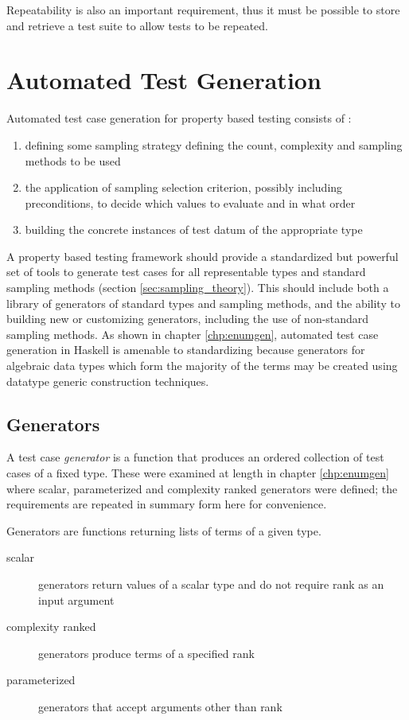 Repeatability is also an important requirement, thus
it must be possible to store and retrieve a test suite to allow tests to be repeated.


\section{Automated Test Generation} \label{reqtestgen}

Automated test case generation for property based testing consists of :

\begin{enumerate}
    \item defining some sampling strategy defining the count, complexity and sampling methods to be used
    \item the application of sampling selection criterion, possibly including preconditions, to decide which values to evaluate and in what order
    \item building the concrete instances of test datum of the appropriate type
\end{enumerate}

A property based testing framework should provide a
standardized but powerful set of tools to generate test cases
for all representable types and standard sampling methods (section \ref{sec:sampling_theory}).
This should include both a library of generators of standard types and sampling methods,
and the ability to building new or customizing generators,
including the use of non-standard sampling methods.
As shown in chapter \ref{chp:enumgen}, 
automated test case generation in Haskell is amenable to standardizing
because generators for algebraic data types which form the majority of the terms
may be created using datatype generic construction techniques.

\subsection{Generators}

A test case \emph{generator} is a function that produces an ordered collection of test cases of a fixed type.
These were examined at length in chapter \ref{chp:enumgen}
where scalar, parameterized and complexity ranked generators were defined;
the requirements are repeated in summary form here for convenience.

Generators are functions returning lists of terms of a given type.
\begin{description}
    \item[scalar] generators return values of a scalar type and do not require rank as an input argument
    \item[complexity ranked] generators produce terms of a specified rank
    \item[parameterized] generators that accept arguments other than rank
\end{description}

